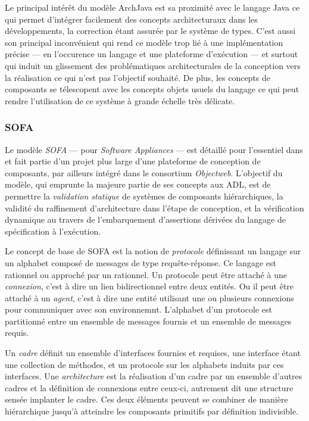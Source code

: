 Le principal int\'er\^et du mod\`ele \textsf{ArchJava} est sa
proximit\'e avec le langage \textsf{Java} ce qui permet d'int\'egrer
facilement des concepts architecturaux dans les d\'eveloppements, la
correction \'etant assur\'ee par le syst\`eme de types. C'est aussi
son principal inconv\'enient qui rend ce mod\`ele trop li\'e \`a
une impl\'ementation pr\'ecise --- en l'occurence un langage et une
plateforme d'ex\'ecution --- et surtout qui induit un glissement des
probl\'ematiques architecturales de la conception vers la
r\'ealisation ce qui n'est pas l'objectif souhait\'e. De plus, les
concepts de composants se t\'elescopent avec les concepts objets
usuels du langage ce qui peut rendre l'utilisation de ce syst\`eme
\`a grande \'echelle tr\`es d\'elicate. 

\subsubsection{SOFA}

Le mod\`ele \emph{SOFA} --- pour \emph{Software Appliances} --- est
d\'etaill\'e pour l'essentiel dans \cite{plasil-sofa} et fait
partie d'un projet plus large d'une plateforme de conception de
composants, par ailleurs int\'egr\'e dans le consortium
\emph{Objectweb}.  L'objectif du mod\`ele, qui emprunte la majeure
partie de ses concepts aux \textsf{ADL}, est de permettre la \emph{validation statique}
de syst\`emes de composants hi\'erarchiques, la validit\'e du raffinement
d'architecture dans l'\'etape de conception, et la v\'erification
dynamique au travers de l'embarquement d'assertions d\'eriv\'ees du
langage de sp\'ecification \`a l'ex\'ecution.

Le concept de base de \textsf{SOFA} est la notion de \emph{protocole} d\'efinissant un
langage sur un
alphabet compos\'e de messages de type requ\^ete-r\'eponse. Ce
langage est rationnel ou approch\'e par un rationnel. Un
protocole peut \^etre attach\'e \`a une \emph{connexion}, c'est
\`a dire un lien bidirectionnel entre deux entit\'es. Ou il
peut \^etre attach\'e  \`a un
\emph{agent}, c'est \`a dire une entit\'e utilisant une ou plusieurs
connexions pour communiquer avec son environnemnt. L'alphabet d'un
protocole est partitionn\'e entre un ensemble de messages
fournis  et un ensemble de messages requis.

Un \emph{cadre}  d\'efinit un ensemble
d'interfaces fournies et requises, une interface \'etant une
collection de m\'ethodes, et un protocole sur les alphabets induits
par ces interfaces. Une \emph{architecture} est la r\'ealisation d'un
cadre par un ensemble d'autres cadres et la d\'efinition de
connexions entre ceux-ci, autrement dit une structure sens\'ee
implanter le cadre. Ces deux \'el\'ements peuvent se combiner de
mani\`ere hi\'erarchique jusqu'\`a atteindre les composants
primitifs par d\'efinition indivisible.

